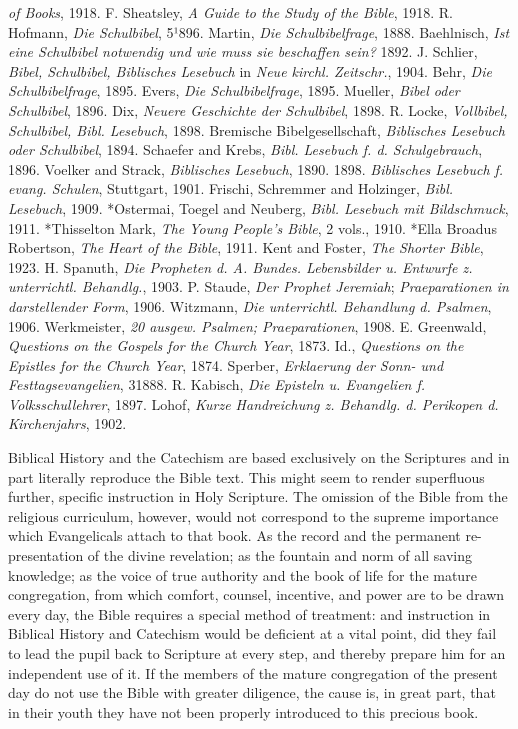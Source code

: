 \emph{of Books}, 1918. F. Sheatsley, \emph{A Guide to the Study of the Bible}, 1918. R. Hofmann, \emph{Die Schulbibel}, 5¹896. Martin, \emph{Die Schulbibelfrage}, 1888. Baehlnisch, \emph{Ist eine Schulbibel notwendig und wie muss sie beschaffen sein?} 1892. J. Schlier, \emph{Bibel, Schulbibel, Biblisches Lesebuch} in \emph{Neue kirchl. Zeitschr.}, 1904. Behr, \emph{Die Schulbibelfrage}, 1895. Evers, \emph{Die Schulbibelfrage}, 1895. Mueller, \emph{Bibel oder Schulbibel}, 1896. Dix, \emph{Neuere Geschichte der Schulbibel}, 1898. R. Locke, \emph{Vollbibel, Schulbibel, Bibl. Lesebuch}, 1898. Bremische Bibelgesellschaft, \emph{Biblisches Lesebuch oder Schulbibel}, 1894. Schaefer and Krebs, \emph{Bibl. Lesebuch f. d. Schulgebrauch}, 1896. Voelker and Strack, \emph{Biblisches Lesebuch}, 1890. 1898. \emph{Biblisches Lesebuch f. evang. Schulen}, Stuttgart, 1901. Frischi, Schremmer and Holzinger, \emph{Bibl. Lesebuch}, 1909. *Ostermai, Toegel and Neuberg, \emph{Bibl. Lesebuch mit Bildschmuck}, 1911. *Thisselton Mark, \emph{The Young People's Bible}, 2 vols., 1910. *Ella Broadus Robertson, \emph{The Heart of the Bible}, 1911. Kent and Foster, \emph{The Shorter Bible}, 1923. H. Spanuth, \emph{Die Propheten d. A. Bundes. Lebensbilder u. Entwurfe z. unterrichtl. Behandlg.}, 1903. P. Staude, \emph{Der Prophet Jeremiah}; \emph{Praeparationen in darstellender Form}, 1906. Witzmann, \emph{Die unterrichtl. Behandlung d. Psalmen}, 1906. Werkmeister, \emph{20 ausgew. Psalmen; Praeparationen}, 1908. E. Greenwald, \emph{Questions on the Gospels for the Church Year}, 1873. Id., \emph{Questions on the Epistles for the Church Year}, 1874. Sperber, \emph{Erklaerung der Sonn- und Festtagsevangelien}, 31888. R. Kabisch, \emph{Die Episteln u. Evangelien f. Volksschullehrer}, 1897. Lohof, \emph{Kurze Handreichung z. Behandlg. d. Perikopen d. Kirchenjahrs}, 1902.

Biblical History and the Catechism are based exclusively on the Scriptures and in part literally reproduce the Bible text. This might seem to render superfluous further, specific instruction in Holy Scripture. The omission of the Bible from the religious curriculum, however, would not correspond to the supreme importance which Evangelicals attach to that book. As the record and the permanent re-presentation of the divine revelation; as the fountain and norm of all saving knowledge; as the voice of true authority and the book of life for the mature congregation, from which comfort, counsel, incentive, and power are to be drawn every day, the Bible requires a special method of treatment: and instruction in Biblical History and Catechism would be deficient
at a vital point, did they fail to lead the pupil back to Scripture at every step, and thereby prepare him for an independent use of it. If the members of the mature congregation of the present day do not use the Bible with greater diligence, the cause is, in great part, that in their youth they have not been properly introduced to this precious book.

